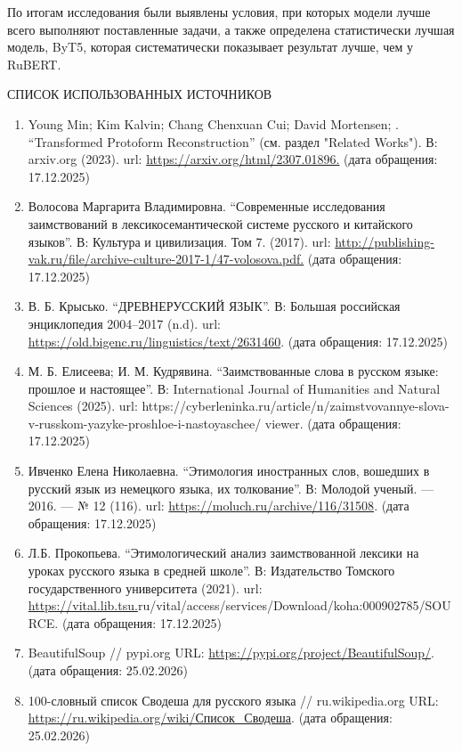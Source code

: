 По итогам исследования были выявлены условия, при которых модели лучше всего выполняют поставленные задачи, а также определена статистически лучшая модель, ByT5, которая систематически показывает результат лучше, чем у RuBERT.

СПИСОК ИСПОЛЬЗОВАННЫХ ИСТОЧНИКОВ

\begin{enumerate}
\def\labelenumi{\arabic{enumi}.}
\item
  Young Min; Kim Kalvin; Chang Chenxuan Cui; David Mortensen; . ``Transformed Protoform Reconstruction'' (см. раздел "Related Works"). В: arxiv.org (2023). url: \url{https://arxiv.org/html/2307.01896.} (дата обращения: 17.12.2025)
\item
  Волосова Маргарита Владимировна. ``Современные исследования заимствований в лексикосемантической системе русского и китайского языков''. В: Культура и цивилизация. Том 7. (2017). url: \url{http://publishing-vak.ru/file/archive-culture-2017-1/47-volosova.pdf.} (дата обращения: 17.12.2025)
\item
  В. Б. Крысько. ``ДРЕВНЕРУССКИЙ ЯЗЫК''. В: Большая российская энциклопедия 2004--2017 (n.d). url: \url{https://old.bigenc.ru/linguistics/text/2631460}. (дата обращения: 17.12.2025)
\item
  М. Б. Елисеева; И. М. Кудрявина. ``Заимствованные слова в русском языке: прошлое и настоящее''. В: International Journal of Humanities and Natural Sciences (2025). url: https://cyberleninka.ru/article/n/zaimstvovannye-slova-v-russkom-yazyke-proshloe-i-nastoyaschee/ viewer. (дата обращения: 17.12.2025)
\item
  Ивченко Елена Николаевна. ``Этимология иностранных слов, вошедших в русский язык из немецкого языка, их толкование''. В: Молодой ученый. --- 2016. --- № 12 (116). url: \url{https://moluch.ru/archive/116/31508}. (дата обращения: 17.12.2025)
\item
  Л.Б. Прокопьева. ``Этимологический анализ заимствованной лексики на уроках русского языка в средней школе''. В: Издательство Томского государственного университета (2021). url: \url{https://vital.lib.tsu.}ru/vital/access/services/Download/koha:000902785/SOURCE. (дата обращения: 17.12.2025)
\item
  BeautifulSoup // pypi.org URL: \url{https://pypi.org/project/BeautifulSoup/}. (дата обращения: 25.02.2026)
\item
  100-словный список Сводеша для русского языка // ru.wikipedia.org URL: \href{https://ru.wikipedia.org/wiki/\%D0\%A1\%D0\%BF\%D0\%B8\%D1\%81\%D0\%BE\%D0\%BA_\%D0\%A1\%D0\%B2\%D0\%BE\%D0\%B4\%D0\%B5\%D1\%88\%D0\%B0}{https://ru.wikipedia.org/wiki/Список\_Сводеша}. (дата обращения: 25.02.2026)

\end{enumerate}
